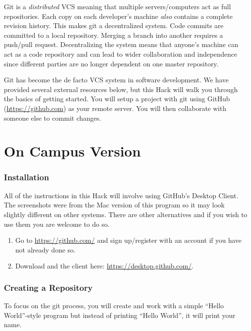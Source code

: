 \documentclass[12pt]{scrartcl}
\begin{document}
Git is a \emph{distributed} VCS meaning that multiple servers/computers 
act as full repositories.  Each copy on each developer's machine 
\emph{also} contains a complete revision history.  This makes git a 
decentralized system.  Code commits are committed to a local repository.  
Merging a branch into another requires a push/pull request.  
Decentralizing the system means that anyone's 
machine can act as a code repository and can lead to wider collaboration 
and independence since different parties are no longer dependent on 
one master repository.

Git has become the de facto VCS system in software development.  We have
provided several external resources below, but this Hack will walk you
through the basics of getting started.  You will setup a project with 
git using GitHub (\url{https://github.com}) as your remote server.  You
will then collaborate with someone else to commit changes.

\part*{On Campus Version}

\section{Installation}

All of the instructions in this Hack will involve using GitHub's 
Desktop Client.  The screenshots were from the Mac version of this
program so it may look slightly different on other systems.  There 
are other alternatives and if you wish to use them you are welcome 
to do so.

\begin{enumerate}
  \item Go to \url{https://github.com/} and sign up/register with
  an account if you have not already done so.
  \item Download and the client here: \url{https://desktop.github.com/}.
\end{enumerate}

\section{Creating a Repository}

To focus on the git process, you will create and work with a simple
``Hello World''-style program but instead of printing ``Hello World'', 
it will print your name. 
\end{document}
